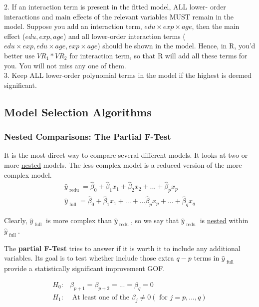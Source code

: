 \documentclass[12pt]{article}
\begin{document}
2. If an interaction term is present in the fitted model, ALL lower-
order interactions and main effects of the relevant variables MUST
remain in the model. Suppose you add an interaction term,
$ edu  \times exp  \times age $, then the main effect ($ edu, exp,
age$) and all lower-order interaction terms ($ edu  \times exp,
edu  \times age, exp  \times age$) should be shown in the model.
Hence, in R, you'd better use $ VR_1*VR_2 $ for interaction term, so
that R will add all these terms for you. You will not miss any one of
them.\\

3. Keep ALL lower-order polynomial terms in the model if the highest
is deemed significant.



\subsection{Model Selection Algorithms}

\subsubsection{Nested Comparisons: The Partial F-Test}

It is the most direct way to compare several different models.
It looks at two or more {\underline {nested}} models.
The less complex model is a reduced version of the more complex model.
\begin{align*}
 \widehat{y}_{\text{ redu }} =  \widehat{\beta}_{0} +  
 \widehat{\beta}_{1}x_1  +  \widehat{\beta}_{2}x_2 + ... +
 \widehat{\beta}_{p}x_{p}\\
 \widehat{y}_{\text{ full }} =  \widehat{\beta}_{0} +  
 \widehat{\beta}_{1}x_1  + ... + ... \widehat{\beta}_{p}x_{p} + 
 ... +  \widehat{\beta}_{q}	x_{q}
\end{align*}

Clearly, $  \widehat{y}_{\text{ full }} $ is more complex than
$  \widehat{y}_{\text{ redu }} $, so we say that 
$  \widehat{y}_{\text{ redu }} $ is {\underline {nested}} within
$  \widehat{y}_{\text{ full }} $.

The {\textbf {partial F-Test}} tries to answer if it is worth it
to include any additional variables. Its goal is to test whether
include those extra $ q - p $ terms in $  \widehat{y}_{\text{ full }} $
provide a statistically significant improvement GOF.

\begin{align*}
H_0:& \beta_{p + 1} = \beta_{p + 2} = ... = \beta_{q} = 0\\
H_1:& \text{ At least one of the } \beta_{j} \ne 0 (\text{ for }
j = p,...,q)
\end{align*}
\end{document}
